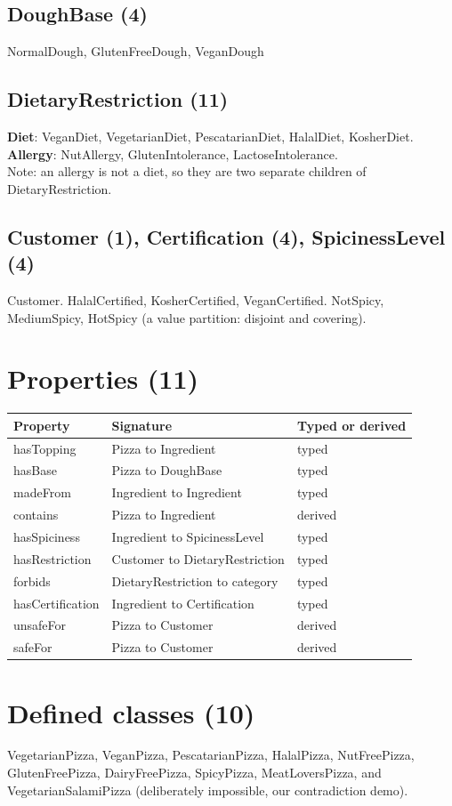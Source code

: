 \documentclass[11pt,a4paper]{article}
\begin{document}
\subsection*{DoughBase (4)}
NormalDough, GlutenFreeDough, VeganDough

\subsection*{DietaryRestriction (11)}
\textbf{Diet}: VeganDiet, VegetarianDiet, PescatarianDiet, HalalDiet, KosherDiet.\\
\textbf{Allergy}: NutAllergy, GlutenIntolerance, LactoseIntolerance.\\
Note: an allergy is not a diet, so they are two separate children of DietaryRestriction.

\subsection*{Customer (1), Certification (4), SpicinessLevel (4)}
Customer. HalalCertified, KosherCertified, VeganCertified. NotSpicy, MediumSpicy, HotSpicy (a value partition: disjoint and covering).

\section{Properties (11)}
\begin{tabular}{lll}
\toprule
Property & Signature & Typed or derived\\
\midrule
hasTopping & Pizza to Ingredient & typed\\
hasBase & Pizza to DoughBase & typed\\
madeFrom & Ingredient to Ingredient & typed\\
contains & Pizza to Ingredient & derived\\
hasSpiciness & Ingredient to SpicinessLevel & typed\\
hasRestriction & Customer to DietaryRestriction & typed\\
forbids & DietaryRestriction to category & typed\\
hasCertification & Ingredient to Certification & typed\\
unsafeFor & Pizza to Customer & derived\\
safeFor & Pizza to Customer & derived\\
\bottomrule
\end{tabular}

\section{Defined classes (10)}
VegetarianPizza, VeganPizza, PescatarianPizza, HalalPizza, NutFreePizza, GlutenFreePizza, DairyFreePizza, SpicyPizza, MeatLoversPizza, and VegetarianSalamiPizza (deliberately impossible, our contradiction demo).
\end{document}
